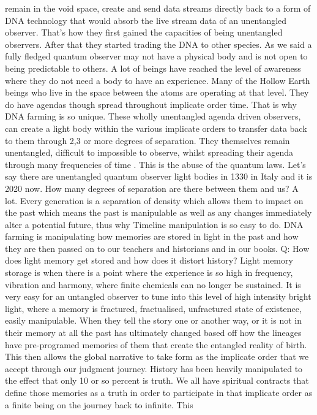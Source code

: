 remain in the void space, create and send data streams directly back to
a form of DNA technology that would absorb the live stream data of an
unentangled observer. That's how they first gained the capacities of
being unentangled observers. After that they started trading the DNA to
other species. As we said a fully fledged quantum observer may not have
a physical body and is not open to being predictable to others. A lot of
beings have reached the level of awareness where they do not need a body
to have an experience. Many of the Hollow Earth beings who live in the
space between the atoms are operating at that level. They do have
agendas though spread throughout implicate order time. That is why DNA
farming is so unique. These wholly unentangled agenda driven observers,
can create a light body within the various implicate orders to transfer
data back to them through 2,3 or more degrees of separation. They
themselves remain unentangled, difficult to impossible to observe,
whilst spreading their agenda through many frequencies of time . This is
the abuse of the quantum laws. Let's say there are unentangled quantum
observer light bodies in 1330 in Italy and it is 2020 now. How many
degrees of separation are there between them and us? A lot. Every
generation is a separation of density which allows them to impact on the
past which means the past is manipulable as well as any changes
immediately alter a potential future, thus why Timeline manipulation is
so easy to do. DNA farming is manipulating how memories are stored in
light in the past and how they are then passed on to our teachers and
historians and in our books. Q: How does light memory get stored and how
does it distort history? Light memory storage is when there is a point
where the experience is so high in frequency, vibration and harmony,
where finite chemicals can no longer be sustained. It is very easy for
an untangled observer to tune into this level of high intensity bright
light, where a memory is fractured, fractualised, unfractured state of
existence, easily manipulable. When they tell the story one or another
way, or it is not in their memory at all the past has ultimately changed
based off how the lineages have pre-programed memories of them that
create the entangled reality of birth. This then allows the global
narrative to take form as the implicate order that we accept through our
judgment journey. History has been heavily manipulated to the effect
that only 10 or so percent is truth. We all have spiritual contracts
that define those memories as a truth in order to participate in that
implicate order as a finite being on the journey back to infinite. This
